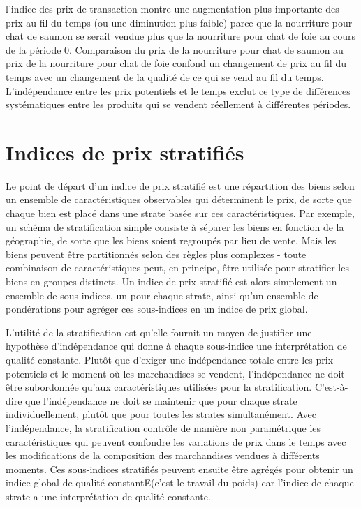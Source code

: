 \documentclass[
]{article}
\begin{document}
l'indice des prix de transaction montre une augmentation plus importante des prix au fil du temps (ou une diminution plus faible) parce que la nourriture pour chat de saumon se serait vendue plus que la nourriture pour chat de foie au cours de la période 0. Comparaison du prix de la nourriture pour chat de saumon au prix de la nourriture pour chat de foie confond un changement de prix au fil du temps avec un changement de la qualité de ce qui se vend au fil du temps. L'indépendance entre les prix potentiels et le temps exclut ce type de différences systématiques entre les produits qui se vendent réellement à différentes périodes.

\hypertarget{indices-de-prix-stratifiuxe9s}{%
\section{Indices de prix stratifiés}\label{indices-de-prix-stratifiuxe9s}}

Le point de départ d'un indice de prix stratifié est une répartition des biens selon un ensemble de caractéristiques observables qui déterminent le prix, de sorte que chaque bien est placé dans une strate basée sur ces caractéristiques. Par exemple, un schéma de stratification simple consiste à séparer les biens en fonction de la géographie, de sorte que les biens soient regroupés par lieu de vente. Mais les biens peuvent être partitionnés selon des règles plus complexes - toute combinaison de caractéristiques peut, en principe, être utilisée pour stratifier les biens en groupes distincts. Un indice de prix stratifié est alors simplement un ensemble de sous-indices, un pour chaque strate, ainsi qu'un ensemble de pondérations pour agréger ces sous-indices en un indice de prix global.

L'utilité de la stratification est qu'elle fournit un moyen de justifier une hypothèse d'indépendance qui donne à chaque sous-indice une interprétation de qualité constante. Plutôt que d'exiger une indépendance totale entre les prix potentiels et le moment où les marchandises se vendent, l'indépendance ne doit être subordonnée qu'aux caractéristiques utilisées pour la stratification. C'est-à-dire que l'indépendance ne doit se maintenir que pour chaque strate individuellement, plutôt que pour toutes les strates simultanément. Avec l'indépendance, la stratification contrôle de manière non paramétrique les caractéristiques qui peuvent confondre les variations de prix dans le temps avec les modifications de la composition des marchandises vendues à différents moments. Ces sous-indices stratifiés peuvent ensuite être agrégés pour obtenir un indice global de qualité constantE(c'est le travail du poids) car l'indice de chaque strate a une interprétation de qualité constante.
\end{document}
